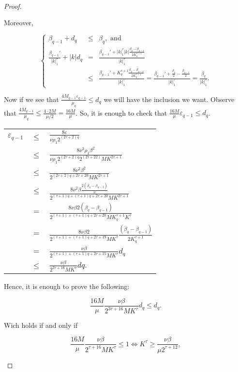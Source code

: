 \begin{proof}
\begin{enumerate}
\begin{itemize}
\begin{itemize}
Moreover,

$$
\left\{
\begin{array}{rcl}
\beta_{q-1} + d_q & \leq & \beta_q, \text{ and}\\
\frac{\beta_{q-1}'}{|k|_1^\tau} + |k|d_q & = & \frac{\beta_{q-1}' + |k|_1^\tau|k|\frac{\beta_q - \beta_{q-1}}{2 K_q^{\tau+1}}}{|k|_1^\tau} \\
& \leq & \frac{\beta_{q-1}' + K_q^{\tau+1}\frac{\beta_q - \beta_{q-1}}{2 K_q^{\tau+1}}}{|k|_1^\tau} = \frac{\beta_{q-1}' + \frac{\beta_q}{2} - \frac{\beta_{q-1}}{2}}{|k|_1^\tau} = \frac{\beta_q}{|k|_1^\tau}.
\end{array}
\right.
$$

Now if we see that $\frac{4 M_{q-1} \varepsilon_{q-1}}{\mu_q} \leq d_q$ we will have the inclusion we want.
Observe that $\frac{4 M_{q-1}}{\mu_q} \leq \frac{4\cdot 2M}{\mu/2} = \frac{16M}{\mu}$. So, it is enough to check that $\frac{16M}{\mu} \varepsilon_{q-1} \leq d_q$.

\begin{longtable}{rcl}
$\varepsilon_{q-1}$ & $\leq$ & $\frac{8\varepsilon}{\nu \rho_1 2^{(2\tau+2)q}}$ \\
& $\leq$ & $\frac{8 \nu^3 \rho_1 \beta^2}{\nu \rho_1 2^{(2\tau+2)q}2^{(2\tau+22)}M K^{2\tau+1}}$\\
& $\leq$ & $\frac{8 \nu^2 \beta^2}{2^{(2\tau+2)q + 2\tau + 20}M K^{2\tau+1}}$ \\
& $\leq$ & $\frac{8 \nu^2 \beta\frac{2(\beta_q-\beta_{q-1})}{\nu}}{2^{(\tau+1)q + (\tau+1)q + 2\tau + 20} M K^{2\tau+1}}$\\
& $=$ & $\frac{8\nu\beta 2(\beta_q - \beta_{q-1})}{2^{(\tau+1) + (\tau+1)q + 2\tau + 20}M K_{q}^{\tau+1}K^\tau}$\\
& $=$ & $\frac{8\nu\beta 2}{2^{(\tau+1) + (\tau+1)q + 2\tau + 19}M K^\tau}\frac{(\beta_q-\beta_{q-1})}{2 K_q^{\tau+1}}$\\
& $=$ & $\frac{\nu \beta}{2^{(\tau+1) + (\tau+1)q + 2\tau + 15} M K^\tau} d_q$\\
& $\leq$ & $\frac{\nu\beta}{2^{3\tau+16}M K^\tau}dq.$
\end{longtable}

Hence, it is enough to prove the following:

$$\frac{16 M}{\mu}\frac{\nu \beta}{2^{3\tau+16} M K^\tau}d_q \leq d_q.$$

Wich holds if and only if

$$\frac{16 M}{\mu}\frac{\nu\beta}{2^{\tau+16} M K^\tau} \leq 1 \Leftrightarrow K^\tau \geq \frac{\nu\beta}{\mu 2^{\tau+12}},$$


\end{itemize}
\end{itemize}
\end{enumerate}
\end{proof}
